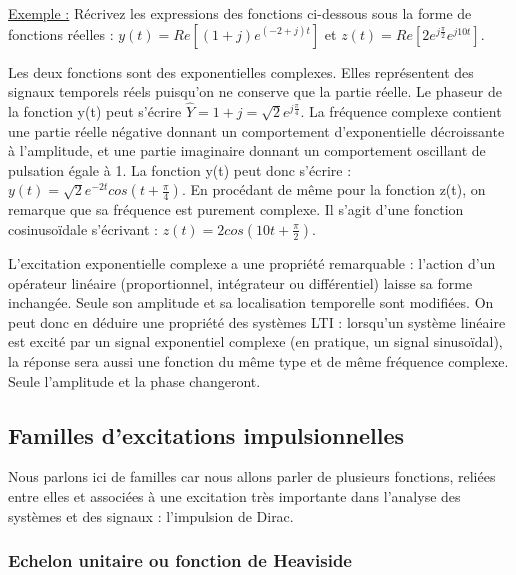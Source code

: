 \documentclass[]{report}
\begin{document}
	\vspace{0.5\baselineskip}
	\underline{Exemple :}
	Récrivez les expressions des fonctions ci-dessous sous la forme de fonctions réelles : $y(t)=Re[(1+j)e^{(-2+j)t}]$ et $z(t) = Re[2e^{j\frac{\pi}{2}}e^{j10t}]$.
	
	Les deux fonctions sont des exponentielles complexes. Elles représentent des signaux temporels réels puisqu'on ne conserve que la partie réelle. Le phaseur de la fonction y(t) peut s'écrire $\hat{Y}=1+j=\sqrt{2}e^{j\frac{\pi}{4}}$. La fréquence complexe contient une partie réelle négative donnant un comportement d'exponentielle décroissante à l'amplitude, et une partie imaginaire donnant un comportement oscillant de pulsation égale à 1. La fonction y(t) peut donc s'écrire : $y(t)=\sqrt{2}e^{-2t}cos(t+\frac{\pi}{4})$.
	En procédant de même pour la fonction z(t), on remarque que sa fréquence est purement complexe. Il s'agit d'une fonction cosinusoïdale s'écrivant : $z(t)=2cos(10t+\frac{\pi}{2})$.
	
	\vspace{0.5\baselineskip}
	
	
	L'excitation exponentielle complexe a une propriété remarquable : l'action d'un opérateur linéaire (proportionnel, intégrateur ou différentiel) laisse sa forme inchangée. Seule son amplitude et sa localisation temporelle sont modifiées. On peut donc en déduire une propriété des systèmes LTI : lorsqu'un système linéaire est excité par un signal exponentiel complexe (en pratique, un signal sinusoïdal), la réponse sera aussi une fonction du même type et de même fréquence complexe. Seule l'amplitude et la phase changeront.
	
	
	
	\subsection{Familles d'excitations impulsionnelles}
	
	Nous parlons ici de familles car nous allons parler de plusieurs
	fonctions, reliées entre elles et associées à une excitation très importante
	dans l'analyse des systèmes et des signaux : l'impulsion de Dirac.
	
	\subsubsection{Echelon unitaire ou fonction de Heaviside}
	
\end{document}
